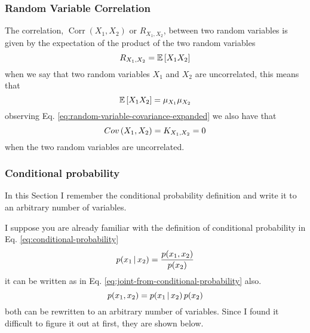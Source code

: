 \documentclass[12pt]{article}
\begin{document}
\subsubsection{Random Variable Correlation} 
The correlation, $\mathop{Corr}(X_1, X_2)$ or $R_{X_1, X_2}$, between two random variables is given by the expectation of the product of the two random variables
\begin{equation}
    R_{X_1, X_2} = \mathbb{E}\left[X_1 X_2\right] 
    \label{eq:correlation}
\end{equation}
when we say that two random variables $X_1$ and $X_2$ are uncorrelated, this means that
\begin{equation*}
    \mathbb{E}\left[X_1 X_2\right] = \mu_{X_1} \mu_{X_2}
\end{equation*}
observing Eq. \ref{eq:random-variable-covariance-expanded} we also have that
\begin{equation*}
    \mathop{Cov}\left(X_1, X_2\right) = K_{X_1, X_2} = 0
\end{equation*}
when the two random variables are uncorrelated.

\subsubsection{Conditional probability}
In this Section I remember the conditional probability definition and write it to an arbitrary number of variables.

I suppose you are already familiar with the definition of conditional probability in Eq. \ref{eq:conditional-probability}
\begin{equation}
    p(x_1 \,|\, x_2) = \dfrac{p(x_1, x_2)}{p(x_2)}    
    \label{eq:conditional-probability}
\end{equation}
it can be written as in Eq. \ref{eq:joint-from-conditional-probability} also.
\begin{equation}
    p(x_1, x_2) = p(x_1 \,|\, x_2) \, p(x_2)
    \label{eq:joint-from-conditional-probability}
\end{equation}
both can be rewritten to an arbitrary number of variables. Since I found it difficult to figure it out at first, they are shown below.
\end{document}
